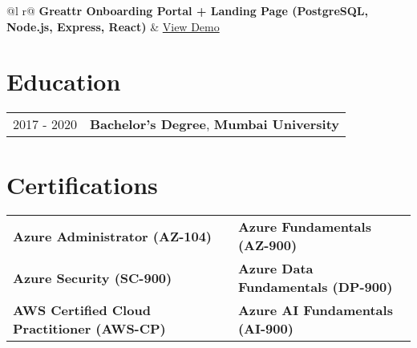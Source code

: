 \documentclass[a4paper,11pt]{article}  %
\begin{document}
\begin{tabularx}{\linewidth}{ @{}l r@{} }
\textbf{Greattr Onboarding Portal + Landing Page (PostgreSQL, Node.js, Express, React)} & \hfill \href{https://www.greattr.com}{View Demo} \\[3.75pt]
\end{tabularx}


\section{Education}
\begin{tabularx}{\linewidth}{@{}l X@{}}	
2017 - 2020 & \textbf{Bachelor's Degree}, \textbf{Mumbai University} \\ 
\end{tabularx}

\section{Certifications}
\begin{tabularx}{\linewidth}{@{}l X l@{}}
\textbf{Azure Administrator (AZ-104)} & & \textbf{Azure Fundamentals (AZ-900)} \\
\textbf{Azure Security (SC-900)} & & \textbf{Azure Data Fundamentals (DP-900)} \\
\textbf{AWS Certified Cloud Practitioner (AWS-CP)} & & \textbf{Azure AI Fundamentals (AI-900)} \\
\end{tabularx}


\end{document}
